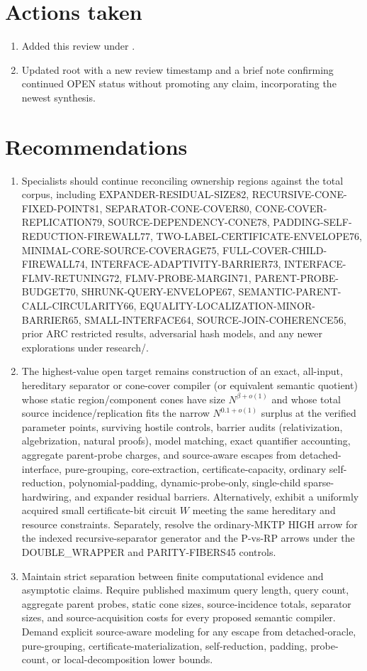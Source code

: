 \documentclass[11pt]{article}
\begin{document}
\section{Actions taken}
\begin{enumerate}
\item Added this review under .
\item Updated root  with a new review timestamp and a brief note confirming continued OPEN status without promoting any claim, incorporating the newest synthesis.
\end{enumerate}

\section{Recommendations}
\begin{enumerate}
\item Specialists should continue reconciling ownership regions against the total corpus, including EXPANDER-RESIDUAL-SIZE82, RECURSIVE-CONE-FIXED-POINT81, SEPARATOR-CONE-COVER80, CONE-COVER-REPLICATION79, SOURCE-DEPENDENCY-CONE78, PADDING-SELF-REDUCTION-FIREWALL77, TWO-LABEL-CERTIFICATE-ENVELOPE76, MINIMAL-CORE-SOURCE-COVERAGE75, FULL-COVER-CHILD-FIREWALL74, INTERFACE-ADAPTIVITY-BARRIER73, INTERFACE-FLMV-RETUNING72, FLMV-PROBE-MARGIN71, PARENT-PROBE-BUDGET70, SHRUNK-QUERY-ENVELOPE67, SEMANTIC-PARENT-CALL-CIRCULARITY66, EQUALITY-LOCALIZATION-MINOR-BARRIER65, SMALL-INTERFACE64, SOURCE-JOIN-COHERENCE56, prior ARC restricted results, adversarial hash models, and any newer explorations under research/.
\item The highest-value open target remains construction of an exact, all-input, hereditary separator or cone-cover compiler (or equivalent semantic quotient) whose static region/component cones have size $N^{\beta+o(1)}$ and whose total source incidence/replication fits the narrow $N^{0.1+o(1)}$ surplus at the verified parameter points, surviving hostile controls, barrier audits (relativization, algebrization, natural proofs), model matching, exact quantifier accounting, aggregate parent-probe charges, and source-aware escapes from detached-interface, pure-grouping, core-extraction, certificate-capacity, ordinary self-reduction, polynomial-padding, dynamic-probe-only, single-child sparse-hardwiring, and expander residual barriers. Alternatively, exhibit a uniformly acquired small certificate-bit circuit $W$ meeting the same hereditary and resource constraints. Separately, resolve the ordinary-MKTP HIGH arrow for the indexed recursive-separator generator and the P-vs-RP arrows under the DOUBLE_WRAPPER and PARITY-FIBERS45 controls.
\item Maintain strict separation between finite computational evidence and asymptotic claims. Require published maximum query length, query count, aggregate parent probes, static cone sizes, source-incidence totals, separator sizes, and source-acquisition costs for every proposed semantic compiler. Demand explicit source-aware modeling for any escape from detached-oracle, pure-grouping, certificate-materialization, self-reduction, padding, probe-count, or local-decomposition lower bounds.
\end{enumerate}
\end{document}
